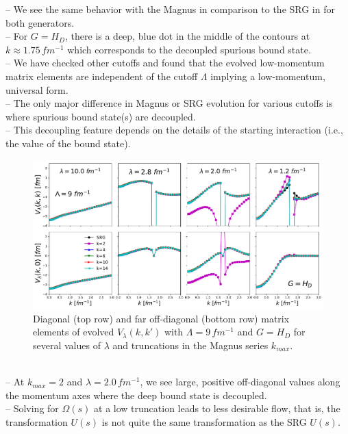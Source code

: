 \documentclass[preprintnumbers,floatfix,aps,prc,preprint,nofootinbib]{revtex4-1}
\begin{document}
%
-- We see the same behavior with the Magnus in comparison to the SRG in \cite{Wendt:2011qj} for both generators.
\\
-- For $G=H_D$, there is a deep, blue dot in the middle of the contours at $k \approx 1.75 \, fm^{-1}$ which corresponds to the decoupled spurious bound state.
\\
-- We have checked other cutoffs and found that the evolved low-momentum matrix elements are independent of the cutoff $\Lambda$ implying a low-momentum, universal form.
\\
-- The only major difference in Magnus or SRG evolution for various cutoffs is where spurious bound state(s) are decoupled.
\\
-- This decoupling feature depends on the details of the starting interaction (i.e., the value of the bound state).
\\
%
\begin{figure}
  \captionsetup{singlelinecheck=false,justification=raggedright}
  \centering
  \includegraphics[width=14cm]{evolved_diags_Wendt_Lamb9_Wegner}
  \hspace*{0.05\textwidth}
  \caption{Diagonal (top row) and far off-diagonal (bottom row) matrix elements of evolved $V_{\lambda}(k,k')$ with $\Lambda=9 \, fm^{-1}$ and $G=H_{D}$ for several values of $\lambda$ and truncations in the Magnus series $k_{max}$.}
  \label{fig:evolved_diags_Wendt_Lamb9_Wegner}
\end{figure}
%
\\
-- At $k_{max}=2$ and $\lambda=2.0 \, fm^{-1}$, we see large, positive off-diagonal values along the momentum axes where the deep bound state is decoupled.
\\
-- Solving for $\Omega(s)$ at a low truncation leads to less desirable flow, that is, the transformation $U(s)$ is not quite the same transformation as the SRG $U(s)$.
\end{document}
